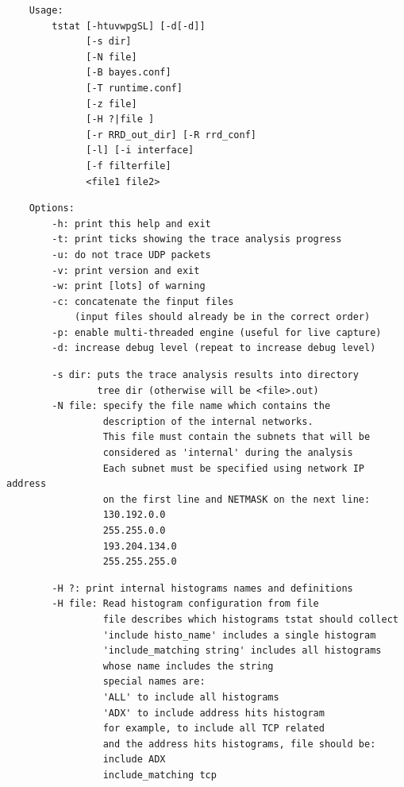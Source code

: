 \documentclass[11pt]{article}
\begin{document}
\begin{small}\begin{verbatim}
    Usage:
        tstat [-htuvwpgSL] [-d[-d]]
              [-s dir]
              [-N file]
              [-B bayes.conf]
              [-T runtime.conf]
              [-z file]
              [-H ?|file ]
              [-r RRD_out_dir] [-R rrd_conf]
              [-l] [-i interface]
              [-f filterfile]
              <file1 file2>
\end{verbatim}\end{small} \noindent
\begin{small}\begin{verbatim}
    Options:
        -h: print this help and exit
        -t: print ticks showing the trace analysis progress
        -u: do not trace UDP packets
        -v: print version and exit
        -w: print [lots] of warning
        -c: concatenate the finput files
            (input files should already be in the correct order)
        -p: enable multi-threaded engine (useful for live capture)
        -d: increase debug level (repeat to increase debug level)
\end{verbatim}\end{small} \noindent
\begin{small}\begin{verbatim}
        -s dir: puts the trace analysis results into directory
                tree dir (otherwise will be <file>.out)
        -N file: specify the file name which contains the
                 description of the internal networks.
                 This file must contain the subnets that will be
                 considered as 'internal' during the analysis
                 Each subnet must be specified using network IP address
                 on the first line and NETMASK on the next line:
                 130.192.0.0
                 255.255.0.0
                 193.204.134.0
                 255.255.255.0
\end{verbatim}\end{small} \noindent
\begin{small}\begin{verbatim}
        -H ?: print internal histograms names and definitions
        -H file: Read histogram configuration from file
                 file describes which histograms tstat should collect
                 'include histo_name' includes a single histogram
                 'include_matching string' includes all histograms
                 whose name includes the string
                 special names are:
                 'ALL' to include all histograms
                 'ADX' to include address hits histogram
                 for example, to include all TCP related
                 and the address hits histograms, file should be:
                 include ADX
                 include_matching tcp
\end{verbatim}\end{small} \noindent
\end{document}

